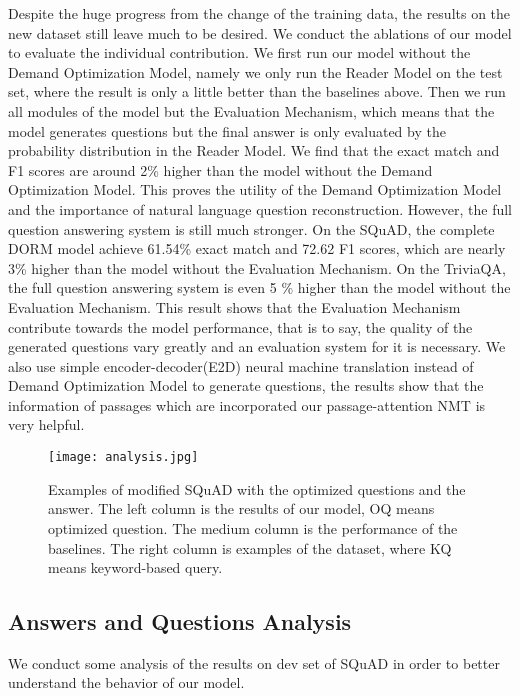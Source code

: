 \documentclass[sigconf]{acmart}
\begin{document}
Despite the huge progress from the change of the training data, the results on the new dataset still leave much to be desired. We conduct the ablations of our model to evaluate the individual contribution. We first run our model without the Demand Optimization Model, namely we only run the Reader Model on the test set, where the result is only a little better than the baselines above. Then we run all modules of the model but the Evaluation Mechanism, which means that the model generates questions but the final answer is only evaluated by the probability distribution in the Reader Model. We find that the exact match and F1 scores are around 2\% higher than the model without the Demand Optimization Model. This proves the utility of the Demand Optimization Model and the importance of natural language question reconstruction. However, the full question answering system is still much stronger. On the SQuAD, the complete DORM model achieve 61.54\% exact match and 72.62 F1 scores, which are nearly 3\% higher than the model without the Evaluation Mechanism. On the TriviaQA, the full question answering system is even 5 \% higher than the model without the Evaluation Mechanism. This result shows that the Evaluation Mechanism contribute towards the model performance, that is to say, the quality of the generated questions vary greatly and an evaluation system for it is necessary. We also use simple encoder-decoder(E2D) neural machine translation instead of Demand Optimization Model to generate questions, the results show that the information of passages which are incorporated our passage-attention NMT is very helpful.

\begin{figure*}[t]
  \begin{center}
  \texttt{[image: analysis.jpg]}
  \caption{Examples of modified SQuAD with the optimized questions and the answer. The left column is the results of our model, OQ means optimized question. The medium column is the performance of the baselines. The right column is examples of the dataset, where KQ means keyword-based query.}
  \end{center}
\end{figure*}






\subsection{Answers and Questions Analysis}
We conduct some analysis of the results on dev set of SQuAD in order to better understand the behavior of our model.
\end{document}
